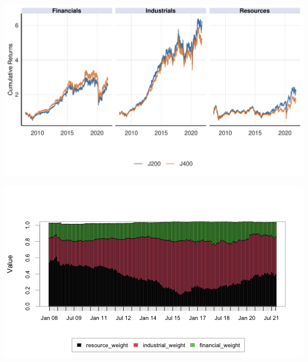 \documentclass[11pt,preprint, authoryear]{elsarticle}
\let\origfigure\figure
\let\endorigfigure\endfigure
\renewenvironment{figure}[1][2] {
    \expandafter\origfigure\expandafter[H]
} {
    \endorigfigure
}
\numberwithin{equation}{section}
\numberwithin{figure}{section}
\numberwithin{table}{section}
\begin{document}
\begin{figure}[H]

{\centering \includegraphics{Paper_files/figure-latex/CumRet-1} 

}

\caption{Cumulative Returns per Sector for ALSI and SWIX \label{CumRet}}\label{fig:CumRet}
\end{figure}

\begin{figure}[H]

{\centering \includegraphics{Paper_files/figure-latex/ALSI-1} 

}

\caption{ALSI Weight Contribution \label{ALSI}}\label{fig:ALSI}
\end{figure}
\end{document}
